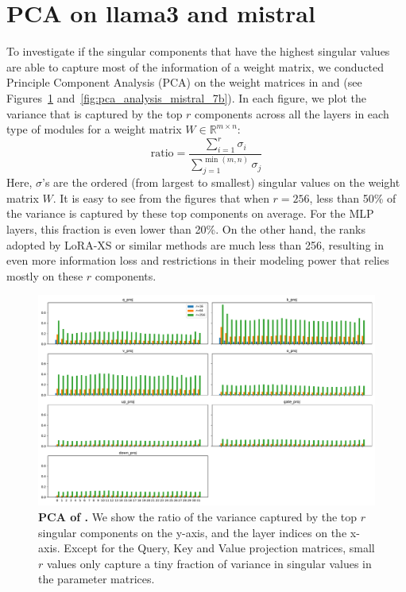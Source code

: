 \section{PCA on llama3 and mistral}
\label{app:sec:pca}

To investigate if the singular components that have the highest singular values are able to capture most of the information of a weight matrix, we conducted Principle Component Analysis (PCA) on the weight matrices in \llama and \mistral (see Figures~\ref{fig:pca_analysis_llama3_8b} and~\ref{fig:pca_analysis_mistral_7b}).
In each figure, we plot the variance that is captured by the top $r$ components across all the layers in each type of modules for a weight matrix $W \in \mathbb{R}^{m \times n}$:
$$\text{ratio} = \frac{\sum_{i=1}^r \sigma_i}{\sum_{j=1}^{\min(m, n)} \sigma_j}$$
Here, $\sigma$'s are the ordered (from largest to smallest) singular values on the weight matrix $W$.
It is easy to see from the figures that when $r=256$, less than 50\% of the variance is captured by these top components on average.
For the MLP layers, this fraction is even lower than 20\%.
On the other hand, the ranks adopted by LoRA-XS or similar methods are much less than 256, resulting in even more information loss and restrictions in their modeling power that relies mostly on these $r$ components.

\begin{figure}[!h]
    \centering
    \includegraphics[width=\textwidth]{images/pca_analysis_llama3-8b.pdf}
    \vspace{-6mm}
    \caption{\textbf{PCA of \llama.} We show the ratio of the variance captured by the top $r$ singular components on the y-axis, and the layer indices on the x-axis. Except for the Query, Key and Value projection matrices, small $r$ values only capture a tiny fraction of variance in singular values in the parameter matrices.}
    \vspace{-4mm}
    \label{fig:pca_analysis_llama3_8b}
\end{figure}


